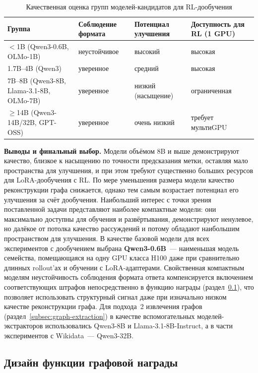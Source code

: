 \begin{table}[H]
\centering
\caption{Качественная оценка групп моделей-кандидатов для RL-дообучения}
\label{tab:model-tiers}
\small
\begin{tabular}{|L{3.4cm}|C{2.6cm}|C{2.8cm}|C{3.2cm}|}
\hline
\textbf{Группа} & \textbf{Соблюдение формата} & \textbf{Потенциал улучшения} & \textbf{Доступность для RL (1 GPU)} \\
\hline
$<$1B (Qwen3-0.6B, OLMo-1B) & неустойчивое & высокий & высокая \\
\hline
1.7B--4B (Qwen3) & уверенное & средний & высокая \\
\hline
7B--8B (Qwen3-8B, Llama-3.1-8B, OLMo-7B) & уверенное & низкий (насыщение) & ограниченная \\
\hline
$\geq$14B (Qwen3-14B/32B, GPT-OSS) & уверенное & очень низкий & требует мультиGPU \\
\hline
\end{tabular}
\end{table}

\textbf{Выводы и финальный выбор.} Модели объёмом 8B и выше демонстрируют качество, близкое к насыщению по точности предсказания метки, оставляя мало пространства для улучшения, и при этом требуют существенно больших ресурсов для LoRA-дообучения с RL. По мере уменьшения размера модели качество реконструкции графа снижается, однако тем самым возрастает потенциал его улучшения за счёт дообучения. Наибольший интерес с точки зрения поставленной задачи представляют наиболее компактные модели: они максимально доступны для обучения и развёртывания, демонстрируют ненулевое, но далёкое от потолка качество рассуждений и потому обладают наибольшим пространством для улучшения. В качестве базовой модели для всех экспериментов с дообучением выбрана \textbf{Qwen3-0.6B}~--- наименьшая модель семейства, помещающаяся на одну GPU класса H100 даже при сравнительно длинных rollout'ах и обучении с LoRA-адаптерами. Свойственная компактным моделям неустойчивость соблюдения формата ответа компенсируется включением соответствующих штрафов непосредственно в функцию награды (раздел~\ref{subsec:reward-design}), что позволяет использовать структурный сигнал даже при изначально низком качестве реконструкции графа. Для подхода~2 извлечения графов (раздел~\ref{subsec:graph-extraction}) в качестве вспомогательных моделей-экстракторов использовались Qwen3-8B и Llama-3.1-8B-Instruct, а в части экспериментов с Wikidata~--- Qwen3-32B.

\subsection{Дизайн функции графовой награды}
\label{subsec:reward-design}


